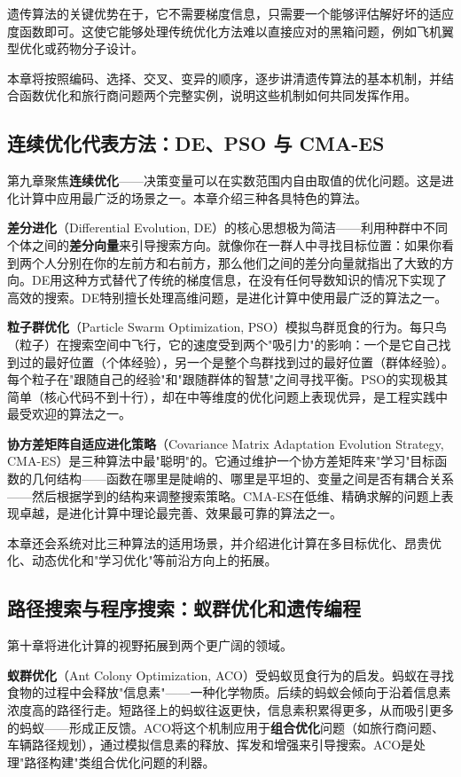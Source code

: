 \documentclass[lang=cn,zihao=-4,a4paper,fontset=windows]{beautybook}
\begin{document}
{遗传算法的关键优势在于，它不需要梯度信息，只需要一个能够评估解好坏的适应度函数即可。这使它能够处理传统优化方法难以直接应对的黑箱问题，例如飞机翼型优化或药物分子设计。

本章将按照编码、选择、交叉、变异的顺序，逐步讲清遗传算法的基本机制，并结合函数优化和旅行商问题两个完整实例，说明这些机制如何共同发挥作用。

\subsection*{连续优化代表方法：DE、PSO 与 CMA-ES}

第九章聚焦\textbf{连续优化}——决策变量可以在实数范围内自由取值的优化问题。这是进化计算中应用最广泛的场景之一。本章介绍三种各具特色的算法。

\textbf{差分进化}（Differential Evolution, DE）的核心思想极为简洁——利用种群中不同个体之间的\textbf{差分向量}来引导搜索方向。就像你在一群人中寻找目标位置：如果你看到两个人分别在你的左前方和右前方，那么他们之间的差分向量就指出了大致的方向。DE用这种方式替代了传统的梯度信息，在没有任何导数知识的情况下实现了高效的搜索。DE特别擅长处理高维问题，是进化计算中使用最广泛的算法之一。

\textbf{粒子群优化}（Particle Swarm Optimization, PSO）模拟鸟群觅食的行为。每只鸟（粒子）在搜索空间中飞行，它的速度受到两个"吸引力"的影响：一个是它自己找到过的最好位置（个体经验），另一个是整个鸟群找到过的最好位置（群体经验）。每个粒子在"跟随自己的经验"和"跟随群体的智慧"之间寻找平衡。PSO的实现极其简单（核心代码不到十行），却在中等维度的优化问题上表现优异，是工程实践中最受欢迎的算法之一。

\textbf{协方差矩阵自适应进化策略}（Covariance Matrix Adaptation Evolution Strategy, CMA-ES）是三种算法中最"聪明"的。它通过维护一个协方差矩阵来"学习"目标函数的几何结构——函数在哪里是陡峭的、哪里是平坦的、变量之间是否有耦合关系——然后根据学到的结构来调整搜索策略。CMA-ES在低维、精确求解的问题上表现卓越，是进化计算中理论最完善、效果最可靠的算法之一。

本章还会系统对比三种算法的适用场景，并介绍进化计算在多目标优化、昂贵优化、动态优化和"学习优化"等前沿方向上的拓展。

\subsection*{路径搜索与程序搜索：蚁群优化和遗传编程}

第十章将进化计算的视野拓展到两个更广阔的领域。

\textbf{蚁群优化}（Ant Colony Optimization, ACO）受蚂蚁觅食行为的启发。蚂蚁在寻找食物的过程中会释放"信息素"——一种化学物质。后续的蚂蚁会倾向于沿着信息素浓度高的路径行走。短路径上的蚂蚁往返更快，信息素积累得更多，从而吸引更多的蚂蚁——形成正反馈。ACO将这个机制应用于\textbf{组合优化}问题（如旅行商问题、车辆路径规划），通过模拟信息素的释放、挥发和增强来引导搜索。ACO是处理"路径构建"类组合优化问题的利器。

}
\end{document}
